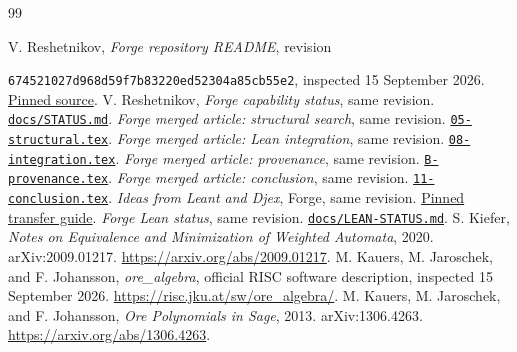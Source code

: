 \begin{thebibliography}{99}
\small\raggedright
\setlength{\itemsep}{1pt}\setlength{\parskip}{0pt}
 V. Reshetnikov, \emph{Forge repository README}, revision\par
\texttt{674521027d968d59f7b83220ed52304a85cb55e2}, inspected 15 September 2026.
\href{https://github.com/VladimirReshetnikov/Forge/blob/674521027d968d59f7b83220ed52304a85cb55e2/README.md}{Pinned source}.
 V. Reshetnikov, \emph{Forge capability status}, same revision.
\href{https://github.com/VladimirReshetnikov/Forge/blob/674521027d968d59f7b83220ed52304a85cb55e2/docs/STATUS.md}{\texttt{docs/STATUS.md}}.
 \emph{Forge merged article: structural search}, same revision.
\href{https://github.com/VladimirReshetnikov/Forge/blob/674521027d968d59f7b83220ed52304a85cb55e2/article/sections/05-structural.tex}{\texttt{05-structural.tex}}.
 \emph{Forge merged article: Lean integration}, same revision.
\href{https://github.com/VladimirReshetnikov/Forge/blob/674521027d968d59f7b83220ed52304a85cb55e2/article/sections/08-integration.tex}{\texttt{08-integration.tex}}.
 \emph{Forge merged article: provenance}, same revision.
\href{https://github.com/VladimirReshetnikov/Forge/blob/674521027d968d59f7b83220ed52304a85cb55e2/article/sections/B-provenance.tex}{\texttt{B-provenance.tex}}.
 \emph{Forge merged article: conclusion}, same revision.
\href{https://github.com/VladimirReshetnikov/Forge/blob/674521027d968d59f7b83220ed52304a85cb55e2/article/sections/11-conclusion.tex}{\texttt{11-conclusion.tex}}.
 \emph{Ideas from Leant and Djex}, Forge, same revision.
\href{https://github.com/VladimirReshetnikov/Forge/blob/674521027d968d59f7b83220ed52304a85cb55e2/docs/IDEAS-FROM-LEANT-DJEX.md}{Pinned transfer guide}.
 \emph{Forge Lean status}, same revision.
\href{https://github.com/VladimirReshetnikov/Forge/blob/674521027d968d59f7b83220ed52304a85cb55e2/docs/LEAN-STATUS.md}{\texttt{docs/LEAN-STATUS.md}}.
 S. Kiefer, \emph{Notes on Equivalence and Minimization of Weighted
Automata}, 2020. arXiv:2009.01217. \url{https://arxiv.org/abs/2009.01217}.
 M. Kauers, M. Jaroschek, and F. Johansson, \emph{ore\_algebra},
official RISC software description, inspected 15 September 2026.
\url{https://risc.jku.at/sw/ore_algebra/}.
 M. Kauers, M. Jaroschek, and F. Johansson,
\emph{Ore Polynomials in Sage}, 2013. arXiv:1306.4263.
\url{https://arxiv.org/abs/1306.4263}.

\end{thebibliography}
